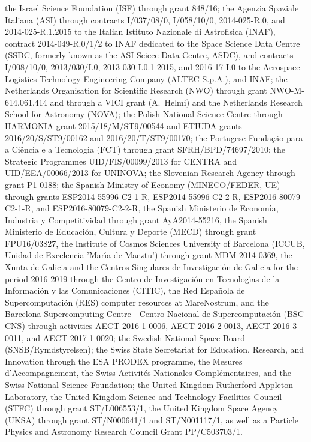 \documentclass[longauth]{aa_gaia} %
\begin{document}
\begin{acknowledgements}
the Israel Science Foundation (ISF) through grant 848/16;
the Agenzia Spaziale Italiana (ASI) through contracts I/037/08/0, I/058/10/0, 2014-025-R.0, and
2014-025-R.1.2015 to the Italian Istituto Nazionale di Astrofisica (INAF), contract 2014-049-R.0/1/2
to INAF dedicated to the Space Science Data Centre (SSDC, formerly known as the ASI Sciece Data
Centre, ASDC), and contracts I/008/10/0, 2013/030/I.0, 2013-030-I.0.1-2015, and 2016-17-I.0 to the
Aerospace Logistics Technology Engineering Company (ALTEC S.p.A.), and INAF;
the Netherlands Organisation for Scientific Research (NWO) through grant NWO-M-614.061.414 and
through a VICI grant (A.~Helmi) and the Netherlands Research School for Astronomy (NOVA);
the Polish National Science Centre through HARMONIA grant 2015/18/M/ST9/00544 and ETIUDA grants 2016/20/S/ST9/00162 and 2016/20/T/ST9/00170;
the Portugese Funda\c{c}\~ao para a Ci\^{e}ncia e a Tecnologia (FCT) through grant
SFRH/BPD/74697/2010; the Strategic Programmes UID/FIS/00099/2013 for CENTRA and UID/EEA/00066/2013
for UNINOVA;
the Slovenian Research Agency through grant P1-0188;
the Spanish Ministry of Economy (MINECO/FEDER, UE) through grants ESP2014-55996-C2-1-R,
ESP2014-55996-C2-2-R, ESP2016-80079-C2-1-R, and ESP2016-80079-C2-2-R, the Spanish Ministerio de
Econom\'{\i}a, Industria y Competitividad through grant AyA2014-55216, the Spanish Ministerio de
Educaci\'{o}n, Cultura y Deporte (MECD) through grant FPU16/03827, the Institute of Cosmos Sciences
University of Barcelona (ICCUB, Unidad de Excelencia 'Mar\'{\i}a de Maeztu') through grant
MDM-2014-0369, the Xunta de Galicia and the Centros Singulares de Investigaci\'{o}n de Galicia for
the period 2016-2019 through the Centro de Investigaci\'{o}n en Tecnolog\'{\i}as de la
Informaci\'{o}n y las Comunicaciones (CITIC), the Red Espa\~{n}ola de Supercomputaci\'{o}n (RES)
computer resources at MareNostrum, and the Barcelona Supercomputing Centre - Centro Nacional de
Supercomputaci\'{o}n (BSC-CNS) through activities AECT-2016-1-0006, AECT-2016-2-0013,
AECT-2016-3-0011, and AECT-2017-1-0020;
the Swedish National Space Board (SNSB/Rymdstyrelsen);
the Swiss State Secretariat for Education, Research, and Innovation through the ESA PRODEX
programme, the Mesures d’Accompagnement, the Swiss Activit\'es Nationales Compl\'ementaires, and the
Swiss National Science Foundation;
the United Kingdom Rutherford Appleton Laboratory, the United Kingdom Science and Technology
Facilities Council (STFC) through grant ST/L006553/1, the United Kingdom Space Agency (UKSA) through
grant ST/N000641/1 and ST/N001117/1, as well as a Particle Physics and Astronomy Research Council
Grant PP/C503703/1.


\end{acknowledgements}
\end{document}
